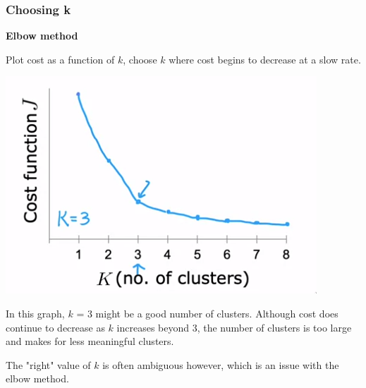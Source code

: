 \documentclass[12pt]{article}
\begin{document}
\subsubsection{Choosing k}

\textbf{Elbow method}

Plot cost as a function of $k$, choose $k$ where cost begins to decrease at a slow rate.

\includegraphics[scale=.6]{elbow}

In this graph, $k$ = 3 might be a good number of clusters. Although cost does continue to decrease as $k$ increases
beyond 3, the number of clusters is too large and makes for less meaningful clusters.

The "right" value of $k$ is often ambiguous however, which is an issue with the elbow method.
\end{document}
